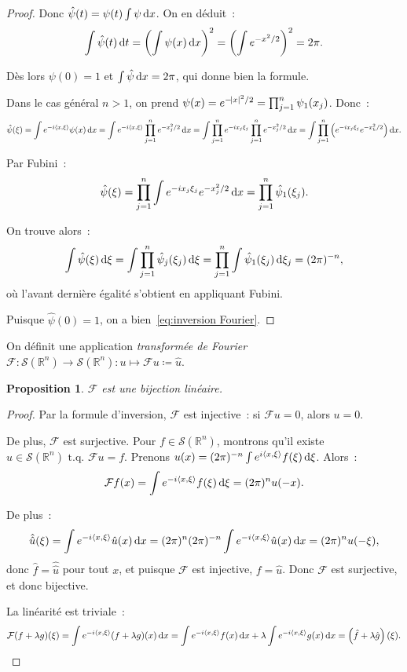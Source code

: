 \documentclass{report}
\newcommand{\R}{{\mathbb R}}
\newcommand{\scpr}[2]{\left\langle#1, #2\right\rangle}
\newcommand{\tq}{\text{ t.q. }}
\newcommand{\dx}{\dif x}
\newtheorem{prp}[thm]{Proposition}
\theoremstyle{definition}
\theoremstyle{remark}
\begin{document}
\begin{proof}
Donc $\hat \psi(t) = \psi(t)\int\psi\dx$. On en déduit~:
\[\int \hat \psi(t)\dif t = \left(\int \psi(x)\dx\right)^2 = \left(\int e^{-x^2/2}\right)^2 = 2\pi.\]

Dès lors $\psi(0) = 1$ et $\int\hat\psi\dx = 2\pi$, qui donne bien la formule.

Dans le cas général $n > 1$, on prend $\psi(x) = e^{-\abs x^2/2} = \prod_{j=1}^n\psi_1(x_j)$. Donc~:
\[\hat\psi(\xi) = \int e^{-i\scpr x\xi}\psi(x)\dx = \int e^{-i\scpr x\xi}\prod_{j=1}^ne^{-x_j^2/2}\dx = \int\prod_{j=1}^ne^{-ix_j\xi_j}\prod_{j=1}^ne^{-x_j^2/2}\dx
	= \int\prod_{j=1}^n\left(e^{-ix_j\xi_j}e^{-x_k^2/2}\right)\dx.\]

Par Fubini~:
\[\hat\psi(\xi) = \prod_{j=1}^n\int e^{-ix_j\xi_j}e^{-x_j^2/2}\dx = \prod_{j=1}^n\hat \psi_1(\xi_j).\]

On trouve alors~:
\[\int \hat \psi(\xi)\dif\xi = \int \prod_{j=1}^n\hat\psi_j(\xi_j)\dif\xi = \prod_{j=1}^n\int\hat \psi_1(\xi_j)\dif\xi_j = (2\pi)^{-n},\]
où l'avant dernière égalité s'obtient en appliquant Fubini.

Puisque $\hat \psi(0) = 1$, on a bien~\eqref{eq:inversion Fourier}.
\end{proof}

On définit une application \textit{transformée de Fourier} $\mathcal F : \mathcal S(\R^n) \to \mathcal S(\R^n) : u \mapsto \mathcal Fu \coloneqq \hat u$.

\begin{prp} $\mathcal F$ est une bijection linéaire.
\end{prp}

\begin{proof} Par la formule d'inversion, $\mathcal F$ est injective~: si $\mathcal Fu = 0$, alors $u = 0$.

De plus, $\mathcal F$ est surjective. Pour $f \in \mathcal S(\R^n)$, montrons qu'il existe $u \in \mathcal S(\R^n) \tq \mathcal Fu = f$.
Prenons $u(x) = (2\pi)^{-n}\int e^{i\scpr x\xi}f(\xi)\dif\xi$. Alors~:
\[\mathcal Ff(x) = \int e^{-i\scpr x\xi}f(\xi)\dif\xi = (2\pi)^nu(-x).\]

De plus~:
\[\hat {\hat u}(\xi) = \int e^{-i\scpr x\xi}\hat u(x)\dx = (2\pi)^n(2\pi)^{-n}\int e^{-i\scpr x\xi}\hat u(x)\dx = (2\pi)^nu(-\xi),\]
donc $\hat f = \hat {\hat u}$ pour tout $x$, et puisque $\mathcal F$ est injective, $f = \hat u$. Donc $\mathcal F$ est surjective, et donc bijective.

La linéarité est triviale~:
\[\mathcal F(f+\lambda g)(\xi) = \int e^{-i\scpr x\xi}(f+\lambda g)(x)\dx = \int e^{-i\scpr x\xi}f(x)\dx + \lambda\int e^{-i\scpr x\xi}g(x)\dx
	= \left(\hat f + \lambda \hat g\right)(\xi).\]
\end{proof}
\end{document}
